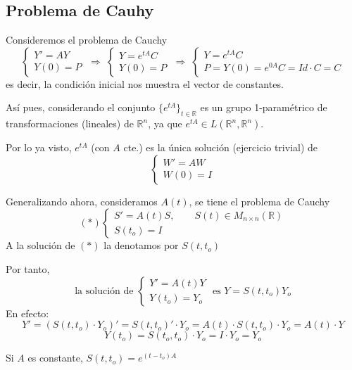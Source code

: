 \subsection{Problema de Cauhy}
Consideremos el problema de Cauchy
$$\left\{ \begin{array}{l}
     Y'=AY  \\
     Y(0)=P 
\end{array}\right. \; \Rightarrow \; \left\{ \begin{array}{l}
     Y=e^{tA}C  \\
     Y(0)=P 
\end{array}\right. \; \Rightarrow \; \left\{ \begin{array}{l}
     Y=e^{tA}C  \\
     P =Y(0)= e^{0A}C=Id \cdot C=C
\end{array}\right.$$
es decir, la condición inicial nos muestra el vector de constantes.
\begin{obs}
    Así pues, considerando el conjunto $\{e^{tA}\}_{t \in \mathbb R}$ es un grupo 1-paramétrico de transformaciones (lineales) de $\mathbb R^n$, ya que $e^{tA}\in L(\mathbb R^n, \mathbb R^n)$.
\end{obs}
\begin{prop} Por lo ya visto, $e^{tA}$ (con $A$ cte.) es la única solución (ejercicio trivial) de 
    $$\left\{ \begin{array}{cc}
         W'=AW  \\
         W(0)=I 
    \end{array} \right.$$
\end{prop}
\begin{prop}
    Generalizando ahora, consideramos $A(t)$, se tiene el problema de Cauchy
    $$(*)\left\{ \begin{array}{l}
         S'=A(t)S, \qquad S(t)\in M_{n \times n}(\mathbb R)  \\
         S(t_o)=I 
    \end{array} \right.$$
    A la solución de $(*)$ la denotamos por $S(t,t_o)$
\end{prop}
Por tanto, 
$$\text{la solución de }\left\{ \begin{array}{l}
         Y'=A(t)Y   \\
         Y(t_o)=Y_o 
    \end{array} \right. \text{ es } Y=S(t,t_o)Y_o$$
    En efecto:
    $$Y'=(S(t,t_o)\cdot Y_o)'=S(t,t_o)' \cdot Y_o = A(t)\cdot S(t,t_o) \cdot Y_o =A(t)\cdot Y$$
    $$Y(t_o)=S(t_o,t_o)\cdot Y_o=I \cdot Y_o = Y_o$$ 
    \;
    \begin{eje}
    Si $A$ es constante, $S(t,t_o)=e^{(t-t_o)A}$
\end{eje}
